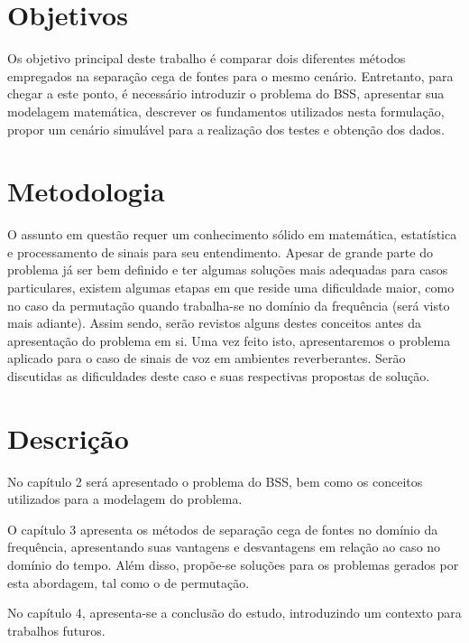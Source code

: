 \section{Objetivos}

Os objetivo principal deste trabalho é comparar dois diferentes métodos empregados na separação cega de fontes para o mesmo cenário. Entretanto, para chegar a este ponto, é necessário introduzir o problema do BSS, apresentar sua modelagem matemática, descrever os fundamentos utilizados nesta formulação, propor um cenário simulável para a realização dos testes e obtenção dos dados.


\section{Metodologia}

O assunto em questão requer um conhecimento sólido em matemática, estatística e processamento de sinais para seu entendimento. Apesar de grande parte do problema já ser bem definido e ter algumas soluções mais adequadas para casos particulares, existem algumas etapas em que reside uma dificuldade maior, como no caso da permutação quando trabalha-se no domínio da frequência (será visto mais adiante). Assim sendo, serão revistos alguns destes conceitos antes da apresentação do problema em si. Uma vez feito isto, apresentaremos o problema aplicado para o caso de sinais de voz em ambientes reverberantes. Serão discutidas as dificuldades deste caso e suas respectivas propostas de solução.


\section{Descrição}

No capítulo 2 será apresentado o problema do BSS, bem como os conceitos utilizados para a modelagem do problema.

O capítulo 3 apresenta os métodos de separação cega de fontes no domínio da frequência, apresentando suas vantagens e desvantagens em relação ao caso no domínio do tempo. Além disso, propõe-se soluções para os problemas gerados por esta abordagem, tal como o de permutação.

No capítulo 4, apresenta-se a conclusão do estudo, introduzindo um contexto para trabalhos futuros.

